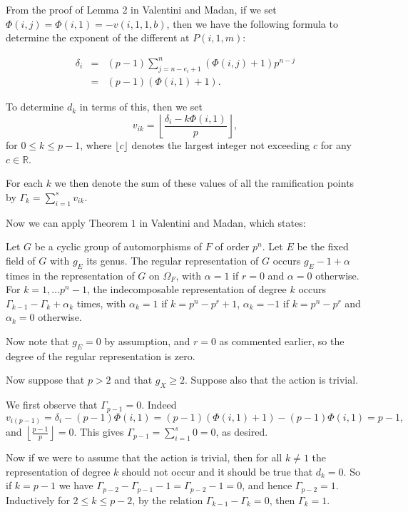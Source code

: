 From the proof of Lemma 2 in Valentini and Madan, if we set $\Phi(i,j) = \Phi(i,1) = -v(i,1,1,b)$, then we have the following formula to determine the exponent of the different at $P(i,1,m)$:

\begin{eqnarray}\label{eq}
\delta_i & = & (p-1)\sum_{j=n-e_i+1}^n (\Phi(i,j) + 1)p^{n-j} \\
	    & = & (p-1)(\Phi(i,1) + 1).
\end{eqnarray}

To determine $d_k$ in terms of this, then we set 
\[
v_{ik} = \left\lfloor \frac{\delta_i - k\Phi(i,1)}{p} \right\rfloor,
\]
for $0\leq k \leq p-1$, where $\lfloor c \rfloor$ denotes the largest integer not exceeding $c$ for any $c\in \mathbb{R}$.

For each $k$ we then denote the sum of these values of all the ramification points by $ \Gamma_k = \sum_{i=1}^s v_{ik}.$

Now we can apply Theorem $1$ in Valentini and Madan, which states:
\begin{thm}
Let $G$ be a cyclic group of automorphisms of $F$ of order $p^n$. 
Let $E$ be the fixed field of $G$ with $g_E$ its genus.
The regular representation of $G$ occurs $g_E-1+\alpha$ times in the representation of $G$ on $\Omega_F$, with $\alpha = 1$ if $r=0$ and $\alpha = 0$ otherwise.
For $k=1,\ldots p^n-1$, the indecomposable representation of degree $k$ occurs $\Gamma_{k-1}-\Gamma_k + \alpha_k$ times, with $\alpha_k = 1$ if $k= p^n-p^r +1$, $\alpha_k = -1$ if $k=p^n-p^r$ and $\alpha_k = 0$ otherwise.
\end{thm}

Now note that $g_E=0$ by assumption, and $r=0$ as commented earlier, so the degree of the regular representation is zero.

Now suppose that $p>2$ and that $g_X\geq 2$.
Suppose also that the action is trivial.


We first observe that $\Gamma_{p-1} = 0$. Indeed
\[
 v_{i(p-1)} = \delta_i - (p-1)\Phi(i,1) = (p-1)(\Phi(i,1) + 1) - (p-1)\Phi(i,1) = p-1,
\]
and $\left \lfloor \frac{p-1}{p} \right\rfloor = 0$. This gives $\Gamma_{p-1} = \sum_{i=1}^s 0 = 0$, as desired.

Now if we were to assume that the action is trivial, then for all $k\neq 1$ the representation of degree $k$ should not occur and it should be true that $d_k = 0$.
So if $k= p-1$ we have $\Gamma_{p-2} - \Gamma_{p-1} - 1 = \Gamma_{p-2} -1 = 0$, and hence $\Gamma_{p-2} = 1$.
Inductively for $2\leq k \leq p-2$, by the relation $\Gamma_{k-1} - \Gamma_k =0$, then $\Gamma_k = 1$.


